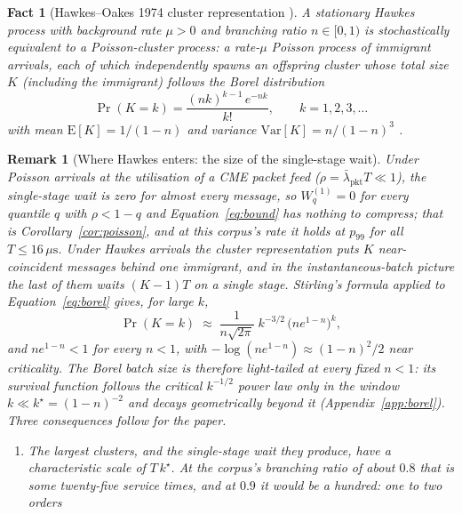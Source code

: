 \documentclass[11pt]{article}
\newtheorem*{fact}{Fact}
\newtheorem{remark}{Remark}[section]
\begin{document}
\begin{fact}[Hawkes--Oakes 1974 cluster representation \citep{hawkesoakes1974}]
A stationary Hawkes process with background rate $\mu > 0$ and branching ratio $n \in [0,
1)$ is stochastically equivalent to a Poisson-cluster process: a rate-$\mu$ Poisson
process of \emph{immigrant} arrivals, each of which independently spawns an offspring
cluster whose total size $K$ (including the immigrant) follows the Borel distribution
\begin{equation}
\Pr(K = k) = \frac{(n k)^{k-1}\, e^{-n k}}{k!}, \qquad k = 1, 2, 3, \ldots
\label{eq:borel}
\end{equation}
with mean $\mathrm{E}[K] = 1/(1-n)$ and variance $\mathrm{Var}[K] = n/(1-n)^3$
\citep{tanner1961}.
\end{fact}

\begin{remark}[Where Hawkes enters: the size of the single-stage wait]
Under Poisson arrivals at the utilisation of a CME packet feed ($\rho =
\bar\lambda_{\mathrm{pkt}} T \ll 1$), the single-stage wait is zero for almost every
message, so $W_q^{(1)} = 0$ for every quantile $q$ with $\rho < 1 - q$ and
Equation~\eqref{eq:bound} has nothing to compress; that is Corollary~\ref{cor:poisson},
and at this corpus's rate it holds at $p_{99}$ for all $T \le 16\,\mu\mathrm{s}$.
Under Hawkes arrivals the cluster representation puts $K$ near-coincident messages behind
one immigrant, and in the instantaneous-batch picture the last of them waits $(K-1)T$ on a
single stage. Stirling's formula applied to Equation~\eqref{eq:borel} gives, for large
$k$,
\begin{equation}
\Pr(K = k) \;\approx\; \frac{1}{n\sqrt{2\pi}}\; k^{-3/2}\, \big(n e^{1-n}\big)^k ,
\label{eq:borel-asymp}
\end{equation}
and $n e^{1-n} < 1$ for every $n < 1$, with $-\log(n e^{1-n}) \approx (1-n)^2/2$ near
criticality. The Borel batch size is therefore light-tailed at every fixed $n < 1$: its survival
function follows the critical $k^{-1/2}$ power law only in the window $k \ll k^\star =
(1-n)^{-2}$ and decays geometrically beyond it (Appendix~\ref{app:borel}). Three
consequences follow for the paper.
\begin{enumerate}
    \item The largest clusters, and the single-stage wait they produce, have a
characteristic scale of $T\,k^\star$. At the corpus's branching ratio of about $0.8$ that
is some twenty-five service times, and at $0.9$ it would be a hundred: one to two orders

\end{enumerate}
\end{remark}
\end{document}
